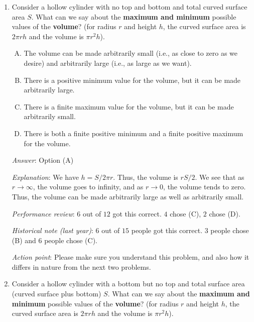 \documentclass[10pt]{amsart}
\begin{document}
\begin{enumerate}
  {\em Historical note (last year)}: $4$ out of $15$ people got this
  correct. $8$ people chose (E) and $3$ people chose (B).

  {\em Action point}: While this problem can be solved using calculus,
  it is much easier if you already know and remember important facts
  about the graphs of quadratic functions. Please review basic facts
  about quadratic functions.
\item Consider a hollow cylinder with no top and bottom and total
  curved surface area $S$. What can we say about the {\bf maximum and
  minimum} possible values of the {\bf volume}? (for radius $r$ and height
  $h$, the curved surface area is $2\pi rh$ and the volume is $\pi
  r^2h$).

  \begin{enumerate}[(A)]
  \item The volume can be made arbitrarily small (i.e., as close to
    zero as we desire) and arbitrarily large (i.e., as large as we
    want).
  \item There is a positive minimum value for the volume, but it can
    be made arbitrarily large.
  \item There is a finite maximum value for the volume, but it can be
    made arbitrarily small.
  \item There is both a finite positive minimum and a finite positive
    maximum for the volume.
  \end{enumerate}

  {\em Answer}: Option (A)

  {\em Explanation}: We have $h = S/2\pi r$. Thus, the volume is
  $rS/2$. We see that as $r \to \infty$, the volume goes to infinity,
  and as $r \to 0$, the volume tends to zero. Thus, the volume can be
  made arbitrarily large as well as arbitrarily small.

  {\em Performance review}: $6$ out of $12$ got this correct. $4$
  chose (C), $2$ chose (D).

  {\em Historical note (last year)}: $6$ out of $15$ people got this
  correct. $3$ people chose (B) and $6$ people chose (C).

  {\em Action point}: Please make sure you understand this problem,
  and also how it differs in nature from the next two problems.

\item Consider a hollow cylinder with a bottom but no top and total
  surface area (curved surface plus bottom) $S$. What can we say about
  the {\bf maximum and minimum} possible values of the {\bf volume}?
  (for radius $r$ and height $h$, the curved surface area is $2\pi rh$
  and the volume is $\pi r^2h$).


\end{enumerate}
\end{document}
